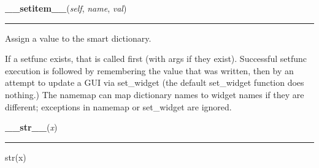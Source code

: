     \label{DataDict:DataDict:__setitem__}

    \vspace{0.5ex}

    \begin{boxedminipage}{\textwidth}

    \raggedright \textbf{\_\_setitem\_\_}(\textit{self}, \textit{name}, \textit{val})

    \vspace{-1.5ex}

    \rule{\textwidth}{0.5\fboxrule}
    Assign a value to the smart dictionary.

    If a setfunc exists, that is called first (with args if they exist). 
    Successful setfunc execution is followed by remembering the value that 
    was written, then by an attempt to update a GUI via set\_widget (the 
    default set\_widget function does nothing.) The namemap can map 
    dictionary names to widget names if they are different; exceptions in 
    namemap or set\_widget are ignored.

    \vspace{1ex}

    \end{boxedminipage}

    \label{object:__str__}

    \vspace{0.5ex}

    \begin{boxedminipage}{\textwidth}

    \raggedright \textbf{\_\_str\_\_}(\textit{x})

    \vspace{-1.5ex}

    \rule{\textwidth}{0.5\fboxrule}
    str(x)

    \vspace{1ex}

    \end{boxedminipage}

    \label{DataDict:DataDict:additem}

    \vspace{0.5ex}

